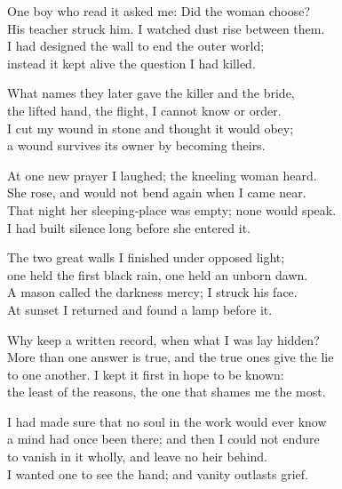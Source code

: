 \begin{founder}
One boy who read it asked me: Did the woman choose?\\
His teacher struck him. I watched dust rise between them.\\
I had designed the wall to end the outer world;\\
instead it kept alive the question I had killed.\\
\medskip

What names they later gave the killer and the bride,\\
the lifted hand, the flight, I cannot know or order.\\
I cut my wound in stone and thought it would obey;\\
a wound survives its owner by becoming theirs.\\

\ornament

At one new prayer I laughed; the kneeling woman heard.\\
She rose, and would not bend again when I came near.\\
That night her sleeping-place was empty; none would speak.\\
I had built silence long before she entered it.\\
\medskip

The two great walls I finished under opposed light;\\
one held the first black rain, one held an unborn dawn.\\
A mason called the darkness mercy; I struck his face.\\
At sunset I returned and found a lamp before it.\\
\medskip

Why keep a written record, when what I was lay hidden?\\
More than one answer is true, and the true ones give the lie\\
to one another. I kept it first in hope to be known:\\
the least of the reasons, the one that shames me the most.\\
\medskip

I had made sure that no soul in the work would ever know\\
a mind had once been there; and then I could not endure\\
to vanish in it wholly, and leave no heir behind.\\
I wanted one to see the hand; and vanity outlasts grief.\\
\medskip


\end{founder}
